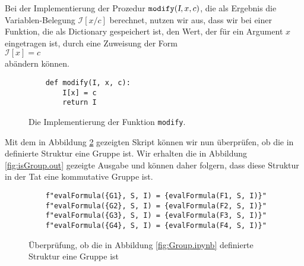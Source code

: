 Bei der Implementierung der Prozedur $\texttt{modify}(\textsl{I},x,c)$, die als Ergebnis die Variablen-Belegung $\mathcal{I}[x/c]$ berechnet, nutzen wir aus, dass
wir bei einer Funktion, die als Dictionary gespeichert ist, den Wert, der für ein Argument $x$ eingetragen ist,
durch eine Zuweisung der Form 
\\[0.2cm]
\hspace*{1.3cm}
$\mathcal{I}[x] \;\texttt{=}\; c$ 
\\[0.2cm]
abändern können.

\begin{figure}[!ht]
\centering
\begin{verbatim}
    def modify(I, x, c):
        I[x] = c
        return I
\end{verbatim}
\vspace*{-0.3cm}
\caption{Die Implementierung der Funktion \texttt{modify}.}
\label{fig:modify.ipynb}
\end{figure}
Mit dem in Abbildung \ref{fig:isGroup.ipynb} gezeigten Skript können wir nun überprüfen, ob die in
 definierte Struktur eine Gruppe ist.  Wir erhalten die in Abbildung \ref{fig:isGroup.out}
gezeigte Ausgabe und können daher folgern, dass diese Struktur in der Tat eine kommutative Gruppe ist.

\begin{figure}[!ht]
\centering
\begin{verbatim}
    f"evalFormula({G1}, S, I) = {evalFormula(F1, S, I)}"
    f"evalFormula({G2}, S, I) = {evalFormula(F2, S, I)}"
    f"evalFormula({G3}, S, I) = {evalFormula(F3, S, I)}"
    f"evalFormula({G4}, S, I) = {evalFormula(F4, S, I)}"
\end{verbatim}
\vspace*{-0.3cm}
\caption{Überprüfung, ob die in Abbildung \ref{fig:Group.ipynb} definierte Struktur eine Gruppe ist}
\label{fig:isGroup.ipynb}
\end{figure}


